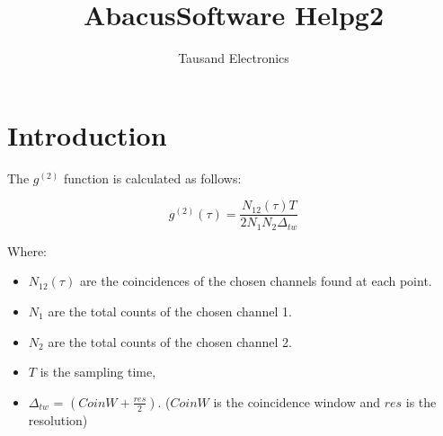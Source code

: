 \documentclass{article}
\title{AbacusSoftware Helpg2}
\author{Tausand Electronics }
\begin{document}
\maketitle

\section*{Introduction}
The $g^{(2)}$ function is calculated as follows:

\begin{equation*}
g^{(2)}(\tau)=\frac{N_{12}(\tau)T}{2N_1N_2\Delta_{tw}}
\end{equation*}

Where:
\begin{itemize}
    \item $N_{12}(\tau)$ are the coincidences of the chosen channels found at each point.
    \item $N_1$ are the total counts of the chosen channel 1.
    \item $N_2$ are the total counts of the chosen channel 2.
    \item $T$ is the sampling time,
    \item $\Delta_{tw}$ = $  (CoinW + \frac{res}{2})$. ($CoinW$ is the coincidence window and $res$ is the resolution)
\end{itemize}
\end{document}
